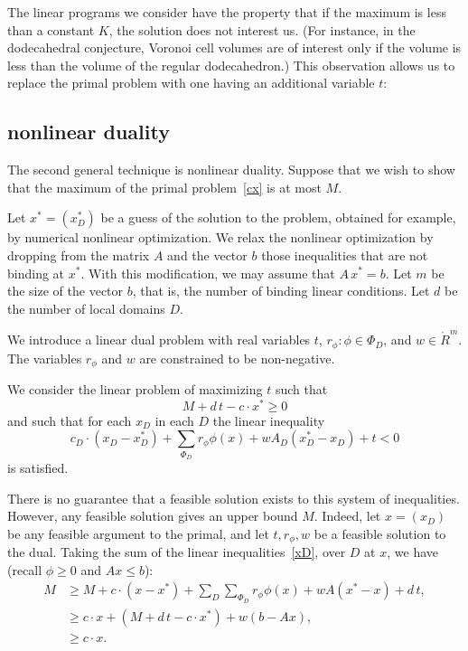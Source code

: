 The linear programs we consider have the property that if the
maximum is less than a constant $K$, the solution does not
interest us.  (For instance, in the dodecahedral conjecture,
Voronoi cell volumes are of interest only if the volume is less
than the volume of the regular dodecahedron.) This observation
allows us to replace the primal problem with one having an
additional variable $t$:


\subsection{nonlinear duality}
The second general technique is nonlinear duality.  Suppose that
we wish to show that the maximum of the primal problem~\ref{cx} is
at most $M$.

Let $x^* = (x^*_D)$ be a guess of the solution to the problem,
obtained for example, by numerical nonlinear optimization. We
relax the nonlinear optimization by dropping from the matrix $A$
and the vector $b$ those inequalities that are not binding at
$x^*$. With this modification, we may assume that $A\,x^*=b$.  Let
$m$ be the size of the vector $b$, that is, the number of binding
linear conditions. Let $d$ be the number of local domains $D$.

We introduce a linear dual problem with real variables $t$,
$r_\phi: \phi\in\Phi_D$, and $w\in\ring{R}^m$. The variables
$r_\phi$ and $w$ are constrained to be non-negative.

We consider the linear problem of maximizing $t$ such that
    \begin{equation}
        M + d\, t - c\cdot x^* \ge 0
        \label{Mx}
    \end{equation}
and such that for each $x_D$ in each $D$ the linear inequality
    \begin{equation}
        c_D\cdot (x_D-x^*_D) + \sum_{\Phi_D} r_\phi \phi(x) +
                    w A_D (x^*_D-x_D) + t
            < 0
        \label{xD}
    \end{equation}
is satisfied.

There is no guarantee that a feasible solution exists to this
system of inequalities.  However, any feasible solution gives an
upper bound $M$. Indeed, let $x=(x_D)$ be any feasible argument to
the primal, and let $t,r_\phi,w$ be a feasible solution to the
dual. Taking the sum of the linear inequalities~\ref{xD}, over $D$
at $x$, we have (recall $\phi\ge0$ and $A x\le b$):
$$
\begin{array}{lll}
M &\ge M + c\cdot (x-x^*) + \sum_D\sum_{\Phi_D} r_\phi \phi(x)
    + w A (x^*-x) + d\, t,\\
    &\ge c\cdot x + (M + d\, t - c\cdot x^*) + w (b-A x),\\
    &\ge c\cdot x.
\end{array}
$$

